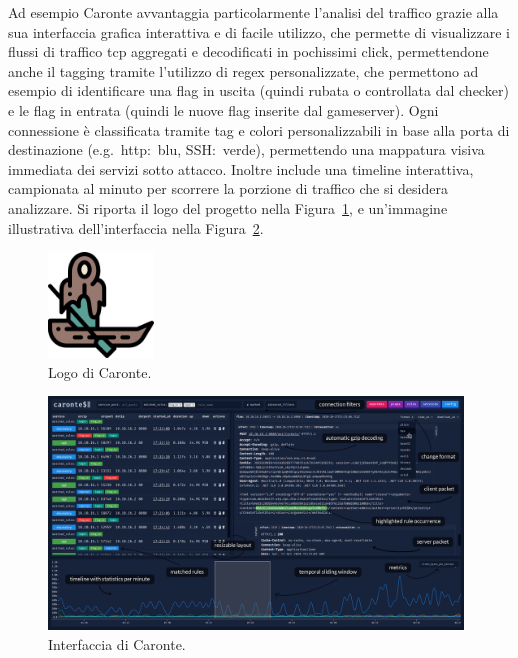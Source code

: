 Ad esempio Caronte avvantaggia particolarmente l'analisi del traffico grazie alla sua interfaccia grafica interattiva e di facile utilizzo, che permette di visualizzare i flussi di traffico \gls{tcp} aggregati e decodificati in pochissimi click, permettendone anche il tagging tramite l'utilizzo di \gls{regex} personalizzate, che permettono ad esempio di identificare una flag in uscita (quindi rubata o controllata dal checker) e le flag in entrata (quindi le nuove flag inserite dal gameserver). Ogni connessione è classificata tramite tag e colori personalizzabili in base alla porta di destinazione (e.g.\ \gls{http}:\ blu, SSH:\ verde), permettendo una mappatura visiva immediata dei servizi sotto attacco. Inoltre include una timeline interattiva, campionata al minuto per scorrere la porzione di traffico che si desidera analizzare.
Si riporta il logo del progetto nella Figura~\ref{fig:caronte_logo}, e un'immagine illustrativa dell'interfaccia nella Figura~\ref{fig:caronte_interface}.

\begin{figure}[H]
    \centering
    \includegraphics[width=0.25\textwidth]{images/chapter1/CaronteLogo.png}
    \caption{Logo di Caronte.}\label{fig:caronte_logo}
\end{figure}

\begin{figure}[H]
    \centering
    \includegraphics[width=0.98\textwidth]{images/chapter1/caronte_interface.png}
    \caption{Interfaccia di Caronte.}\label{fig:caronte_interface}
\end{figure}

